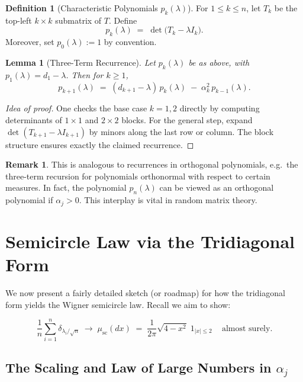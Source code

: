 \documentclass[letterpaper,11pt,oneside,reqno]{article}
\numberwithin{equation}{section}
\newtheorem{lemma}[proposition]{Lemma}
\theoremstyle{definition}
\newtheorem{definition}[proposition]{Definition}
\newtheorem{remark}[proposition]{Remark}
\begin{document}
\begin{definition}[Characteristic Polynomials $p_k(\lambda)$]
For $1 \le k \le n$, let $T_k$ be the top-left $k \times k$ submatrix of $T$. Define
\[
  p_k(\lambda) \;=\; \det\bigl(T_k - \lambda I_k\bigr).
\]
Moreover, set $p_0(\lambda):=1$ by convention.
\end{definition}

\begin{lemma}[Three-Term Recurrence]
\label{lem:3term-recurrence}
Let $p_k(\lambda)$ be as above, with $p_1(\lambda) = d_1 - \lambda$. Then for $k \ge 1$,
\[
  p_{k+1}(\lambda)
  \;=\;
  (d_{k+1} - \lambda)\,p_k(\lambda)
  \;-\;\alpha_k^2\,p_{k-1}(\lambda).
\]
\end{lemma}

\begin{proof}[Idea of proof]
One checks the base case $k=1,2$ directly by computing determinants of $1\times1$ and $2\times2$ blocks. For the general step, expand $\det(T_{k+1}-\lambda I_{k+1})$ by minors along the last row or column. The block structure ensures exactly the claimed recurrence.
\end{proof}

\begin{remark}
This is analogous to recurrences in orthogonal polynomials, e.g.\ the three-term recursion for polynomials orthonormal with respect to certain measures. In fact, the polynomial $p_n(\lambda)$ can be viewed as an orthogonal polynomial if $\alpha_j>0$. This interplay is vital in random matrix theory.
\end{remark}


\section{Semicircle Law via the Tridiagonal Form}
\label{sec:semicircle-tridiag}

We now present a fairly detailed sketch (or roadmap) for how the tridiagonal form yields the Wigner semicircle law. Recall we aim to show:

\[
  \frac{1}{n}\sum_{i=1}^n \delta_{\lambda_i/\sqrt{n}}
  \;\longrightarrow\;
  \mu_{\mathrm{sc}}(dx)\;=\;\frac{1}{2\pi}\sqrt{4 - x^2}\; 1_{|x|\le2}\,
  \quad\text{almost surely}.
\]

\subsection{The Scaling and Law of Large Numbers in \(\alpha_j\)}
\end{document}
